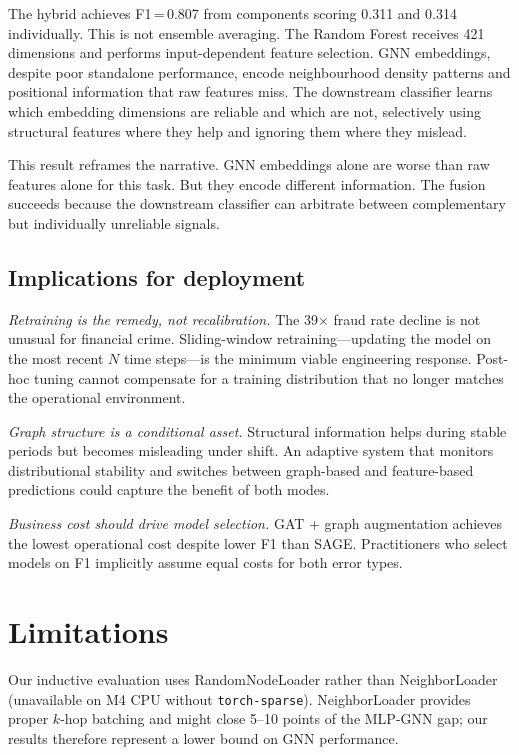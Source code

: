 \documentclass[11pt]{article}
\begin{document}
The hybrid achieves F1\,=\,0.807 from components scoring 0.311 and
0.314 individually.  This is not ensemble averaging.  The Random
Forest receives 421 dimensions and performs input-dependent feature
selection.  GNN embeddings, despite poor standalone performance,
encode neighbourhood density patterns and positional information
that raw features miss.  The downstream classifier learns which
embedding dimensions are reliable and which are not, selectively
using structural features where they help and ignoring them where
they mislead.

This result reframes the narrative.  GNN embeddings alone are worse
than raw features alone for this task.  But they encode different
information.  The fusion succeeds because the downstream classifier
can arbitrate between complementary but individually unreliable
signals.

\subsection{Implications for deployment}

\textit{Retraining is the remedy, not recalibration.}  The
39$\times$ fraud rate decline is not unusual for financial crime.
Sliding-window retraining---updating the model on the most recent
$N$ time steps---is the minimum viable engineering response.  Post-hoc
tuning cannot compensate for a training distribution that no longer
matches the operational environment.

\textit{Graph structure is a conditional asset.}  Structural
information helps during stable periods but becomes misleading under
shift.  An adaptive system that monitors distributional stability
and switches between graph-based and feature-based predictions could
capture the benefit of both modes.

\textit{Business cost should drive model selection.}  GAT + graph
augmentation achieves the lowest operational cost despite lower F1
than SAGE.  Practitioners who select models on F1 implicitly assume
equal costs for both error types.

\section{Limitations}

Our inductive evaluation uses RandomNodeLoader rather than
NeighborLoader (unavailable on M4 CPU without
\texttt{torch-sparse}).  NeighborLoader provides proper $k$-hop
batching and might close 5--10 points of the MLP-GNN gap; our
results therefore represent a lower bound on GNN performance.
\end{document}
